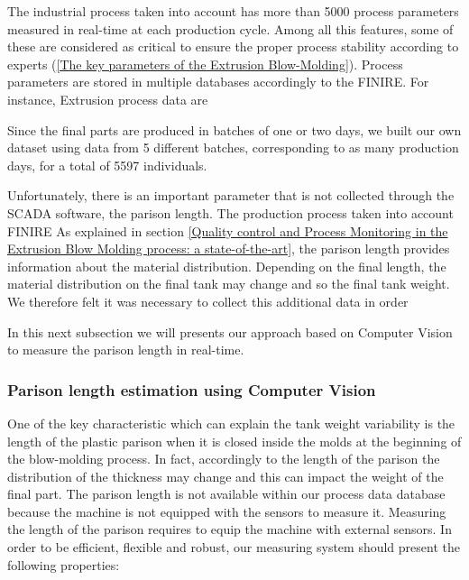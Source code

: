 The industrial process taken into account has more than 5000 process parameters measured in real-time at each production cycle. Among all this features, some of these are considered as critical to ensure the proper process stability according to experts (\ref{The key parameters of the Extrusion Blow-Molding}). Process parameters are stored in multiple databases accordingly to the FINIRE. For instance, Extrusion process data are 


Since the final parts are produced in batches of one or two days, we built our own dataset using data from 5 different batches, corresponding to as many production days, for a total of 5597 individuals. 

 
Unfortunately, there is an important parameter that is not collected through the SCADA software, the parison length. The production process taken into account FINIRE 
As explained in section \ref{Quality control and Process Monitoring in the Extrusion Blow Molding process: a state-of-the-art}, the parison length provides information about the material distribution. Depending on the final length, the material distribution on the final tank may change and so the final tank weight. We therefore felt it was necessary to collect this additional data in order

In this next subsection we will presents our approach based on Computer Vision to measure the parison length in real-time.

\subsubsection{Parison length estimation using Computer Vision}

One of the key characteristic which can explain the tank weight variability is the length of the plastic parison when it is closed inside the molds at the beginning of the blow-molding process. In fact, accordingly to the length of the parison the distribution of the thickness may change and this can impact the weight of the final part. The parison length is not available within our process data database because the machine is not equipped with the sensors to measure it. Measuring the length of the parison requires to equip the machine with external sensors. In order to be efficient, flexible and robust, our measuring system should present the following properties:

